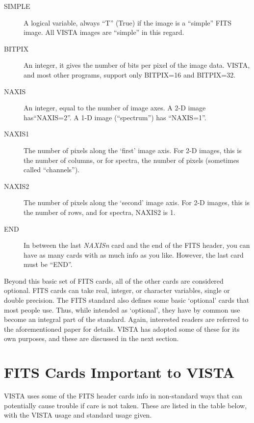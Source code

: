 \begin{description}
      \item[SIMPLE] A logical variable, always ``T'' (True) if the
		    image is a ``simple'' FITS image.  All VISTA images are
		    ``simple'' in this regard.

      \item[BITPIX] An integer, it gives the number of bits per pixel
		    of the image data.  VISTA, and most other programs,
		    support only BITPIX=16 and BITPIX=32.

      \item[NAXIS]  An integer, equal to the number of image axes.  A 2-D
		    image has\hfil\break ``NAXIS=2''.  A 1-D image
		    (``spectrum'') has ``NAXIS=1''.

      \item[NAXIS1] The number of pixels along the `first' image axis.  For 2-D
		    images, this is the number of columns, or for spectra, the
		    number of pixels (sometimes called ``channels'').

      \item[NAXIS2] The number of pixels along the `second' image axis.  For
		    2-D images, this is the number of rows, and for spectra,
		    NAXIS2 is 1.

      \item[END]    In between the last {\it NAXISn} card and the end of the
		    FITS header, you can have as many cards with as much
		    info as you like.  However, the last card must be ``END''.
\end{description}

Beyond this basic set of FITS cards, all of the other cards are considered
optional.  FITS cards can take real, integer, or character variables, single
or double precision.  The FITS standard also defines some basic `optional'
cards that most people use.  Thus, while intended as `optional', they have by
common use become an integral part of the standard.  Again, interested readers
are referred to the aforementioned paper for details.  VISTA has adopted some
of these for its own purposes, and these are discussed in the next section.

\section{FITS Cards Important to VISTA}

VISTA uses some of the FITS header cards info in non-standard ways that can
potentially cause trouble if care is not taken.  These are listed in the table
below, with the VISTA usage and standard usage given.

